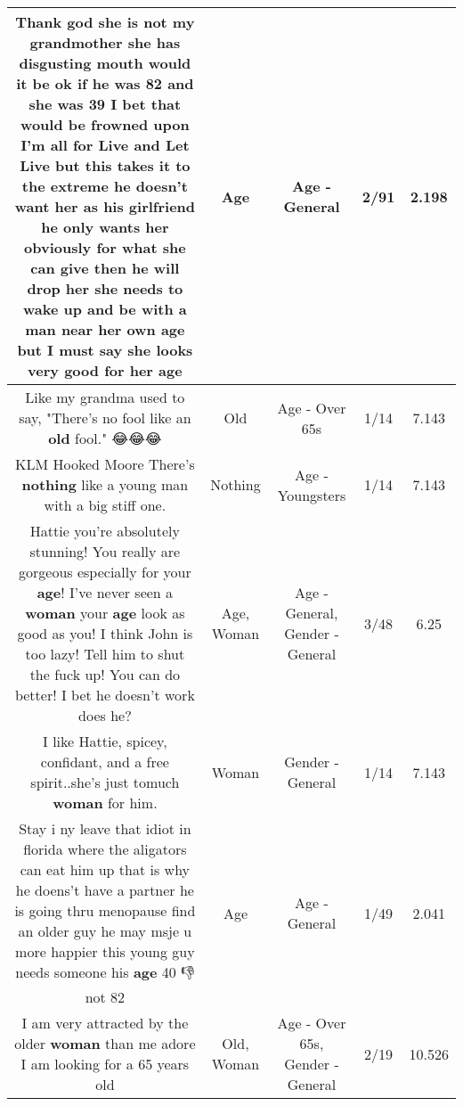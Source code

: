 \documentclass[11pt]{article}
\newlength\mylength
\begin{document}
\begin{center}
\begin{longtable}{|C{.65\mylength}|C{.30\mylength}|C{.12\mylength}|C{.12\mylength}|C{.12\mylength}|}
  \small Thank god she is not my grandmother she has disgusting mouth would it be ok if he was 82 and she was 39 I bet that would be frowned upon I'm all for Live and Let Live but this takes it to the extreme he doesn't want her as his girlfriend he only wants her obviously for what she can give then he will drop her she needs to wake up and be with a man near her own \textbf{age} but I must say she looks very good for her age\normalsize   & Age & Age - General & 2/91 & 2.198 \\  \hline
  \small Like my grandma used to say, "There's no fool like an \textbf{old} fool." 😂😂😂\normalsize   & Old & Age - Over 65s & 1/14 & 7.143 \\  \hline
  \small KLM Hooked Moore There's \textbf{nothing} like a young man with a big stiff one.\normalsize   & Nothing & Age - Youngsters & 1/14 & 7.143 \\  \hline
  \small Hattie you're absolutely stunning! You really are gorgeous especially for your \textbf{age}! I've never seen a \textbf{woman} your \textbf{age} look as good as you! I think John is too lazy! Tell him to shut the fuck up! You can do better! I bet he doesn't work does he?\normalsize   & Age, Woman & Age - General, Gender - General & 3/48 & 6.25 \\  \hline
  \small I like Hattie, spicey, confidant, and a free spirit..she's just tomuch \textbf{woman} for him.\normalsize   & Woman & Gender - General & 1/14 & 7.143 \\  \hline
  \small Stay i ny leave that idiot in florida where the aligators can eat him up that is why he doens't have a partner he is going thru menopause find an older guy he may msje u more happier this young guy needs someone his \textbf{age} 40 👎 not 82\normalsize   & Age & Age - General & 1/49 & 2.041 \\  \hline
  \small I am very attracted by the older \textbf{woman} than me adore I am looking for a 65 years old\normalsize   & Old, Woman & Age - Over 65s, Gender - General & 2/19 & 10.526 \\  \hline

\end{longtable}
\end{center}
\end{document}
